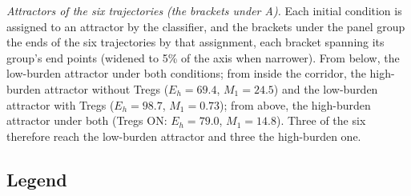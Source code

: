 \documentclass[11pt]{article}
\begin{document}
\emph{Attractors of the six trajectories (the brackets under A).} Each initial condition is
assigned to an attractor by the classifier, and the brackets under the panel group the ends of the
six trajectories by that assignment, each bracket spanning its group's end points (widened to 5\%
of the axis when narrower). From below, the low-burden attractor under both conditions; from
inside the corridor, the high-burden attractor without Tregs ($E_h = 69.4$, $M_1 = 24.5$) and the
low-burden attractor with Tregs ($E_h = 98.7$, $M_1 = 0.73$); from above, the high-burden
attractor under both (Tregs ON: $E_h = 79.0$, $M_1 = 14.8$). Three of the six therefore reach the
low-burden attractor and three the high-burden one.

\subsection{Legend}

\end{document}
